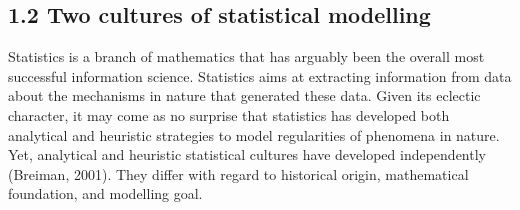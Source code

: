 \documentclass[authoryear,review,3p]{elsarticle}
\begin{document}
\subsection*{1.2 Two cultures of statistical modelling}

Statistics is a branch of mathematics that has arguably been the
overall most successful information science.
Statistics aims at extracting information from data
about the mechanisms in nature that generated these data.
%
Given its eclectic character, it may come as no surprise that statistics
has developed both analytical and heuristic strategies
to model regularities of phenomena in nature.
Yet, analytical and heuristic statistical cultures
have developed independently (Breiman, 2001).
They differ with regard to historical origin, mathematical foundation,
and modelling goal.
\end{document}
